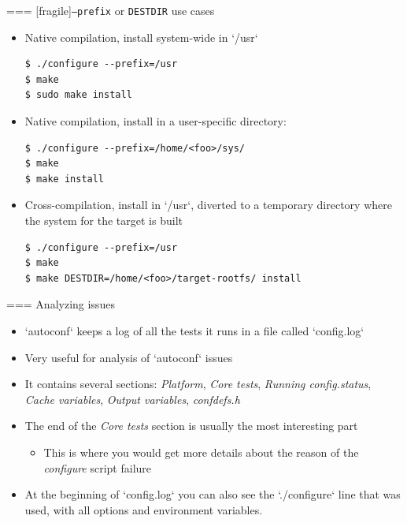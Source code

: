 === [fragile]{{\tt --prefix} or {\tt DESTDIR} use cases}
  \begin{itemize}
  \item Native compilation, install system-wide in `/usr`
    \begin{block}{}
{\tiny
\begin{verbatim}
$ ./configure --prefix=/usr
$ make
$ sudo make install
\end{verbatim}}
\end{block}
\item Native compilation, install in a user-specific directory:
  \begin{block}{}
{\tiny
\begin{verbatim}
$ ./configure --prefix=/home/<foo>/sys/
$ make
$ make install
\end{verbatim}}
\end{block}
\item Cross-compilation, install in `/usr`, diverted to a
  temporary directory where the system for the target is built
  \begin{block}{}
{\tiny
\begin{verbatim}
$ ./configure --prefix=/usr
$ make
$ make DESTDIR=/home/<foo>/target-rootfs/ install
\end{verbatim}}
\end{block}

\end{itemize}



=== {Analyzing issues}
  \begin{itemize}
  \item `autoconf` keeps a log of all the tests it runs in a file
    called `config.log`
  \item Very useful for analysis of `autoconf` issues
  \item It contains several sections: {\em Platform}, {\em Core
      tests}, {\em Running config.status}, {\em Cache variables}, {\em
      Output variables}, {\em confdefs.h}
  \item The end of the {\em Core tests} section is usually the most
    interesting part
    \begin{itemize}
    \item This is where you would get more details about the reason of
      the {\em configure} script failure
    \end{itemize}
  \item At the beginning of
    `config.log` you can also see the
    `./configure` line that was used, with all options and environment variables.
  \end{itemize}


